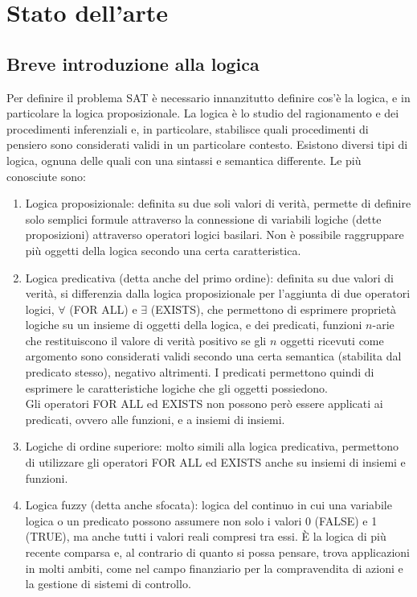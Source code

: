 \chapter{Stato dell'arte}

\section{Breve introduzione alla logica} 
Per definire il problema SAT è necessario innanzitutto definire cos'è la logica, e in particolare la
logica proposizionale.
La logica è lo studio del ragionamento e dei procedimenti inferenziali e, in particolare, stabilisce
quali procedimenti di pensiero sono considerati validi in un particolare contesto.
Esistono diversi tipi di logica, ognuna delle quali con una sintassi e semantica differente. 
Le più conosciute sono:
\begin{enumerate}
    \item Logica proposizionale: definita su due soli valori di verità, permette di definire solo semplici
    formule attraverso la connessione di variabili logiche (dette proposizioni) attraverso operatori 
    logici basilari. Non è possibile raggruppare più oggetti della logica secondo una certa caratteristica.
    \item Logica predicativa (detta anche del primo ordine): definita su due valori di verità, si differenzia dalla logica proposizionale per l'aggiunta
    di due operatori logici, $\forall$ (FOR ALL) e $\exists$ (EXISTS), che permettono di esprimere proprietà logiche
    su un insieme di oggetti della logica, e dei predicati, funzioni $n$-arie che restituiscono il valore di verità
    positivo se gli $n$ oggetti ricevuti come argomento sono considerati validi secondo una certa semantica (stabilita dal predicato stesso),
    negativo altrimenti. I predicati permettono quindi di esprimere le caratteristiche logiche che gli oggetti possiedono.\\
    Gli operatori FOR ALL ed EXISTS non possono però essere applicati ai predicati, ovvero alle funzioni, e a insiemi di insiemi.
    \item Logiche di ordine superiore: molto simili alla logica predicativa, permettono di utilizzare gli operatori
    FOR ALL ed EXISTS anche su insiemi di insiemi e funzioni.
    \item Logica fuzzy (detta anche sfocata): logica del continuo in cui una variabile logica o un predicato possono assumere non solo i valori
    0 (FALSE) e 1 (TRUE), ma anche tutti i valori reali compresi tra essi. È la logica di più recente comparsa e, al
    contrario di quanto si possa pensare, trova applicazioni in molti ambiti, come nel campo finanziario per la compravendita di azioni e 
    la gestione di sistemi di controllo.
\end{enumerate}
